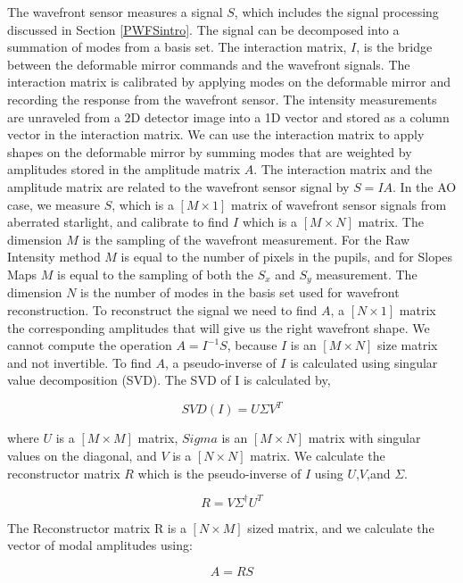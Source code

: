 The wavefront sensor measures a signal $S$, which includes the signal processing discussed in Section \ref{PWFSintro}. The signal can be decomposed into a summation of modes from a basis set. The interaction matrix, $I$, is the bridge between the deformable mirror commands and the wavefront signals. The interaction matrix is calibrated by applying modes on the deformable mirror and recording the response from the wavefront sensor. The intensity measurements are unraveled from a 2D detector image into a 1D vector and stored as a column vector in the interaction matrix. We can use the interaction matrix to apply shapes on the deformable mirror by summing modes that are weighted by amplitudes stored in the amplitude matrix $A$. The interaction matrix and the amplitude matrix are related to the wavefront sensor signal by $S=IA$. In the AO case, we measure $S$, which is a $[M\times 1]$ matrix of wavefront sensor signals from aberrated starlight, and calibrate to find $I$ which is a $[M\times N]$ matrix. The dimension $M$ is the sampling of the wavefront measurement. For the Raw Intensity method $M$ is equal to the number of pixels in the pupils, and for Slopes Maps $M$ is equal to the sampling of both the $S_x$ and $S_y$ measurement. The dimension $N$ is the number of modes in the basis set used for wavefront reconstruction. To reconstruct the signal we need to find $A$, a $[N\times 1]$ matrix the corresponding amplitudes that will give us the right wavefront shape. We cannot compute the operation $A=I^{-1}S$, because $I$ is an $[M\times N]$ size matrix and not invertible. To find $A$, a pseudo-inverse of $I$ is calculated using singular value decomposition (SVD). The SVD of I is calculated by,

\begin{equation}
    SVD(I)=U\Sigma V^T
\end{equation}

\noindent where $U$ is a $[M\times M]$ matrix, $Sigma$ is an $[M\times N]$ matrix with singular values on the diagonal, and $V$ is a $[N\times N]$ matrix. We calculate the reconstructor matrix $R$ which is the pseudo-inverse of $I$ using $U$,$V$,and $\Sigma$.

\begin{equation}
   R=V\Sigma^{\dag}U^T
\end{equation}

The Reconstructor matrix R is a $[N\times M]$ sized matrix, and we calculate the vector of modal amplitudes using:

\begin{equation}
    A=RS
    \label{ReconEq}
\end{equation}

